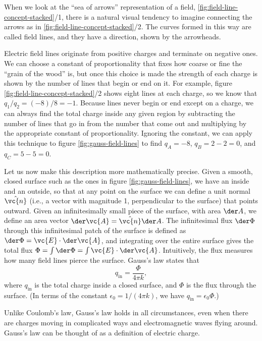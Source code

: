 When we look at the ``sea of arrows'' representation of a field,
\ref{fig:field-line-concept-stacked}/1, there is a natural visual tendency to
imagine connecting the arrows as in \ref{fig:field-line-concept-stacked}/2.
The curves formed in this way are called field lines, and they have a
direction, shown by the arrowheads. 


Electric field lines originate from positive
charges and terminate on negative ones. We can choose a constant of proportionality that fixes
how coarse or fine the ``grain of the wood'' is, but once this choice is made 
the strength of each charge is shown by the number of lines that begin or end on it. For example, figure
\ref{fig:field-line-concept-stacked}/2
shows eight lines at each charge, so we know that $q_1/q_2=(-8)/8=-1$. Because lines never begin or end except on a charge,
we can always find the total charge inside any given region by subtracting the number of lines that go in from the number
that come out and multiplying by the appropriate constant of proportionality. Ignoring the constant, we can apply this
technique to figure \ref{fig:gauss-field-lines} to find $q_A=-8$, $q_B=2-2=0$, and $q_C=5-5=0$.


Let us now make this description more mathematically precise.
Given a smooth, closed surface such as the ones in figure \ref{fig:gauss-field-lines},
we have an inside and an outside, so that at any point on the surface we can
define a unit normal $\hat{\vc{n}}$ (i.e., a vector with magnitude 1, perpendicular to the
surface) that points outward. Given an infinitesimally small piece of the surface, with
area $\der A$, we define an area vector $\der\vc{A}=\hat{\vc{n}}\der A$.
The infinitesimal flux $\der\Phi$ through this infinitesimal patch of the surface is defined
as $\der\Phi=\vc{E}\cdot\der\vc{A}$, and integrating over the entire surface gives the total flux
$\Phi=\int\der\Phi=\int \vc{E}\cdot\der\vc{A}$. Intuitively, the flux
measures how many field lines pierce the surface. Gauss's law states that
\begin{equation}
  q_\text{in}=\frac{\Phi}{4\pi k},
\end{equation}
where $q_\text{in}$ is the total charge inside a closed surface, and $\Phi$ is the
flux through the surface. (In terms of the constant $\epsilon_0=1/(4\pi k)$, we have 
$q_\text{in}=\epsilon_0\Phi$.)

Unlike Coulomb's law, Gauss's law holds in all circumstances, even when there are charges
moving in complicated ways and electromagnetic waves flying around. Gauss's law can be
thought of as a definition of electric charge. 
